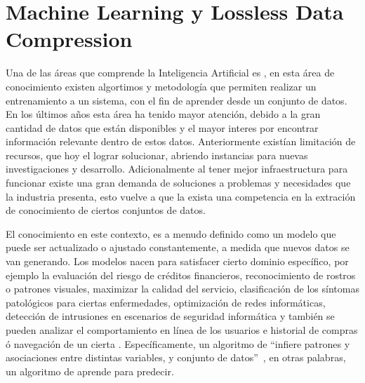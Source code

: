 

\chapter[Machine Learning y Lossless Data Compression]{Machine Learning y Lossless Data Compression}\label{ch:Compresion-Machine-Learning}


Una de las áreas que comprende la Inteligencia Artificial es \machinelearning, en esta área de conocimiento existen algortimos y metodología que permiten realizar un entrenamiento a un sistema, con el fin de aprender desde un conjunto de datos. En los últimos años esta área ha tenido mayor atención, debido a la gran cantidad de datos que están disponibles y el mayor interes por encontrar información relevante dentro de estos datos. Anteriormente existían limitación de recursos, que hoy el \cloudcomputing lograr solucionar, abriendo instancias para nuevas investigaciones y desarrollo. Adicionalmente al tener mejor infraestructura para funcionar existe una gran demanda de soluciones a problemas y necesidades que la industria presenta, esto vuelve a que la exista una competencia en la extración de conocimiento de ciertos conjuntos de datos.

El conocimiento en este contexto, es a menudo definido como un modelo que puede ser actualizado o ajustado constantemente, a medida que nuevos datos se van generando. Los modelos nacen para satisfacer cierto dominio específico, por ejemplo la evaluación del riesgo de créditos financieros, reconocimiento de rostros o patrones visuales, maximizar la calidad del servicio, clasificación de los síntomas patológicos para ciertas enfermedades, optimización de redes informáticas, detección de intrusiones en escenarios de seguridad informática y también se pueden analizar el comportamiento en línea de los usuarios e historial de compras ó navegación  de un cierta \web. Específicamente, un algoritmo de \machinelearning ``infiere patrones y asociaciones entre distintas variables, y conjunto de datos''~\cite[capítulo 8]{guller2015big}, en otras palabras, un algoritmo de \machinelearning aprende para predecir. 


